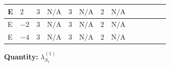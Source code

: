 \documentclass[8pt]{article}
\begin{document}
\begin{landscape}
\begin{longtable}{@{}llcccccc >{\raggedright\arraybackslash}p{0.21\linewidth} >{\raggedright\arraybackslash}p{0.21\linewidth} >{\raggedright\arraybackslash}p{0.21\linewidth}@{}}
\midrule
E & $2$ & $3$ & $\text{N/A}$ & $3$ & $\text{N/A}$ & $2$ & $\text{N/A}$ & \scriptsize\adjustbox{max width=\linewidth}{$\begin{gathered} +8 {\lambda_{S_1}^{(1)}} {\lambda_{S_1}^{(A)}}\end{gathered}$} & \scriptsize\adjustbox{max width=\linewidth}{$\begin{gathered} +16 {\lambda_{S_1}^{(A)}}^2\end{gathered}$} & \scriptsize\adjustbox{max width=\linewidth}{$\begin{gathered} +{g_1}^2 \left(8 {g_2}^2-12 {\lambda_{S_1}^{(1)}}\right)\end{gathered}$} \\
\midrule
E & $-2$ & $3$ & $\text{N/A}$ & $3$ & $\text{N/A}$ & $2$ & $\text{N/A}$ & \scriptsize\adjustbox{max width=\linewidth}{$\begin{gathered} +8 {\lambda_{S_1}^{(1)}} {\lambda_{S_1}^{(A)}}\end{gathered}$} & \scriptsize\adjustbox{max width=\linewidth}{$\begin{gathered} +16 {\lambda_{S_1}^{(A)}}^2\end{gathered}$} & \scriptsize\adjustbox{max width=\linewidth}{$\begin{gathered} +{g_1}^2 \left(8 {g_2}^2-12 {\lambda_{S_1}^{(1)}}\right)\end{gathered}$} \\
\midrule
E & $-4$ & $3$ & $\text{N/A}$ & $3$ & $\text{N/A}$ & $2$ & $\text{N/A}$ & \scriptsize\adjustbox{max width=\linewidth}{$\begin{gathered} +8 {\lambda_{S_1}^{(1)}} {\lambda_{S_1}^{(A)}}\end{gathered}$} & \scriptsize\adjustbox{max width=\linewidth}{$\begin{gathered} +16 {\lambda_{S_1}^{(A)}}^2\end{gathered}$} & \scriptsize\adjustbox{max width=\linewidth}{$\begin{gathered} +{g_1}^2 \left(32 {g_2}^2-48 {\lambda_{S_1}^{(1)}}\right)\end{gathered}$} \\
\midrule
\bottomrule
\end{longtable}
\clearpage
\noindent\textbf{Quantity: }$\lambda_{S_1}^{(1)}$\par\smallskip

\end{landscape}
\end{document}
